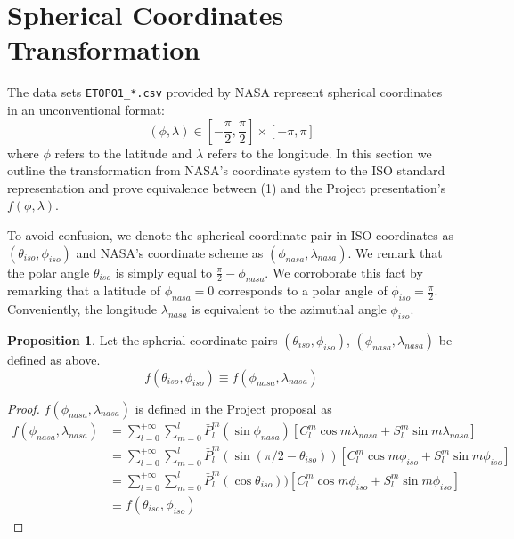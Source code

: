 \documentclass[a4paper]{article}
\theoremstyle{definition}
\newtheorem{proposition}{Proposition}
\begin{document}
\appendix
\section{Spherical Coordinates Transformation}

The data sets \verb|ETOPO1_*.csv| provided by NASA represent spherical coordinates in an unconventional format: $$(\phi, \lambda) \in [-\frac{\pi}{2}, \frac{\pi}{2}] \times [-\pi, \pi] $$ where $\phi$ refers to the latitude
and $\lambda$ refers to the longitude. In this section we outline the transformation from NASA's coordinate system to the ISO standard representation and prove equivalence between (1) and the Project presentation's $f(\phi, \lambda)$.

To avoid confusion, we denote the spherical coordinate pair in ISO coordinates as $(\theta_{iso}, \phi_{iso})$ and NASA's coordinate scheme as $(\phi_{nasa}, \lambda_{nasa})$.
We remark that the polar angle $\theta_{iso}$ is simply equal to $\frac{\pi}{2} - \phi_{nasa}$. We corroborate this fact by remarking that a latitude of $\phi_{nasa} = 0$ corresponds to a polar
angle of $\phi_{iso} = \frac{\pi}{2}$. Conveniently, the longitude $\lambda_{nasa}$ is equivalent to the azimuthal angle $\phi_{iso}$.

\begin{proposition} Let the spherial coordinate pairs $(\theta_{iso}, \phi_{iso})$, $(\phi_{nasa}, \lambda_{nasa})$ be defined as above. 
    \begin{equation*}
        f(\theta_{iso}, \phi_{iso}) \equiv f(\phi_{nasa}, \lambda_{nasa})
    \end{equation*}

    
\end{proposition}



\begin{proof}
    $f(\phi_{nasa}, \lambda_{nasa})$ is defined in the Project proposal as 
    \begin{align} \label{eq:project_def} 
        f(\phi_{nasa}, \lambda_{nasa}) &= \sum_{l = 0}^{+\infty}\sum_{m = 0}^l \bar P_l^m(\sin\phi_{nasa})[C_l^m\cos m\lambda_{nasa} + S_l^m \sin m \lambda_{nasa}] \\ 
                                       &= \sum_{l = 0}^{+\infty}\sum_{m = 0}^l \bar P_l^m(\sin(\pi/2 - \theta_{iso}))[C_l^m\cos m\phi_{iso} + S_l^m \sin m \phi_{iso}] \\
                                       &= \sum_{l = 0}^{+\infty}\sum_{m = 0}^l \bar P_l^m(\cos\theta_{iso}))[C_l^m\cos m\phi_{iso} + S_l^m \sin m \phi_{iso}] \\
                                       &\equiv f(\theta_{iso}, \phi_{iso})
    \end{align}

\end{proof}
\end{document}
